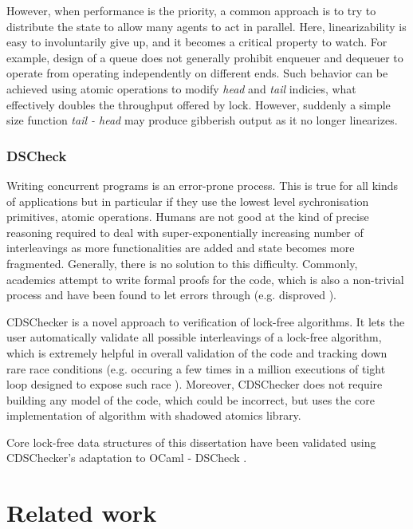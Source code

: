 \documentclass[12pt,a4paper,twoside]{report}
\begin{document}
However, when performance is the priority, a common approach is to try to distribute the state to allow many agents to act in parallel. Here, linearizability is easy to involuntarily give up, and it becomes a critical property to watch. For example, design of a queue does not generally prohibit enqueuer and dequeuer to operate from operating independently on different ends. Such behavior can be achieved using atomic operations to modify \textit{head} and \textit{tail} indicies, what effectively doubles the throughput offered by lock. However, suddenly a simple size function \textit{tail - head} may produce gibberish output as it no longer linearizes. 

\subsection{DSCheck}
\label{section:background_dscheck}
Writing concurrent programs is an error-prone process. This is true for all kinds of applications but in particular if they use the lowest level sychronisation primitives, atomic operations. Humans are not good at the kind of precise reasoning required to deal with super-exponentially increasing number of interleavings as more functionalities are added and state becomes more fragmented. Generally, there is no solution to this difficulty. Commonly, academics attempt to write formal proofs for the code, which is also a non-trivial process and have been found to let errors through (e.g. \cite{Norris2013} disproved \cite{correct_and_efficiect_deque}). 

CDSChecker \cite{Norris2013} is a novel approach to verification of lock-free algorithms. It lets the user automatically validate all possible interleavings of a lock-free algorithm, which is extremely helpful in overall validation of the code and tracking down rare race conditions (e.g. occuring a few times in a million executions of tight loop designed to expose such race \cite{litmus}). Moreover, CDSChecker does not require building any model of the code, which could be incorrect, but uses the core implementation of algorithm with shadowed atomics library. 

Core lock-free data structures of this dissertation have been validated using CDSChecker's adaptation to OCaml - DSCheck \cite{sadiqjds97:online}. 



\chapter{Related work}
\end{document}
